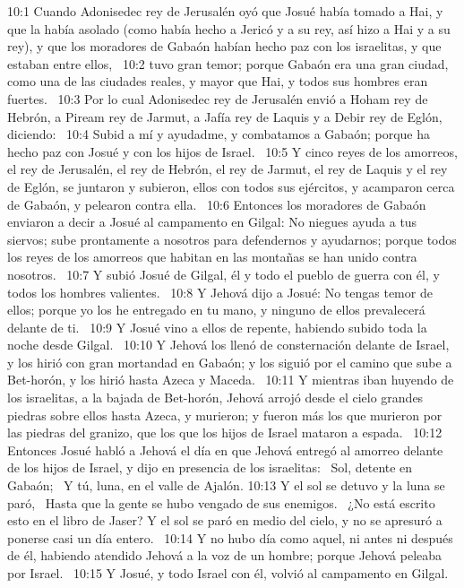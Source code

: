 10:1 Cuando Adonisedec rey de Jerusalén oyó que Josué había tomado a Hai, y que la había asolado (como había hecho a Jericó y a su rey, así hizo a Hai y a su rey), y que los moradores de Gabaón habían hecho paz con los israelitas, y que estaban entre ellos,  
10:2 tuvo gran temor; porque Gabaón era una gran ciudad, como una de las ciudades reales, y mayor que Hai, y todos sus hombres eran fuertes.  
10:3 Por lo cual Adonisedec rey de Jerusalén envió a Hoham rey de Hebrón, a Piream rey de Jarmut, a Jafía rey de Laquis y a Debir rey de Eglón, diciendo:  
10:4 Subid a mí y ayudadme, y combatamos a Gabaón; porque ha hecho paz con Josué y con los hijos de Israel.  
10:5 Y cinco reyes de los amorreos, el rey de Jerusalén, el rey de Hebrón, el rey de Jarmut, el rey de Laquis y el rey de Eglón, se juntaron y subieron, ellos con todos sus ejércitos, y acamparon cerca de Gabaón, y pelearon contra ella.  
10:6 Entonces los moradores de Gabaón enviaron a decir a Josué al campamento en Gilgal: No niegues ayuda a tus siervos; sube prontamente a nosotros para defendernos y ayudarnos; porque todos los reyes de los amorreos que habitan en las montañas se han unido contra nosotros.  
10:7 Y subió Josué de Gilgal, él y todo el pueblo de guerra con él, y todos los hombres valientes.  
10:8 Y Jehová dijo a Josué: No tengas temor de ellos; porque yo los he entregado en tu mano, y ninguno de ellos prevalecerá delante de ti.  
10:9 Y Josué vino a ellos de repente, habiendo subido toda la noche desde Gilgal.  
10:10 Y Jehová los llenó de consternación delante de Israel, y los hirió con gran mortandad en Gabaón; y los siguió por el camino que sube a Bet-horón, y los hirió hasta Azeca y Maceda.  
10:11 Y mientras iban huyendo de los israelitas, a la bajada de Bet-horón, Jehová arrojó desde el cielo grandes piedras sobre ellos hasta Azeca, y murieron; y fueron más los que murieron por las piedras del granizo, que los que los hijos de Israel mataron a espada.  
10:12 Entonces Josué habló a Jehová el día en que Jehová entregó al amorreo delante de los hijos de Israel, y dijo en presencia de los israelitas:  
Sol, detente en Gabaón;  
Y tú, luna, en el valle de Ajalón. 
10:13 Y el sol se detuvo y la luna se paró,  
Hasta que la gente se hubo vengado de sus enemigos.  
¿No está escrito esto en el libro de Jaser? Y el sol se paró en medio del cielo, y no se apresuró a ponerse casi un día entero.  
10:14 Y no hubo día como aquel, ni antes ni después de él, habiendo atendido Jehová a la voz de un hombre; porque Jehová peleaba por Israel.  
10:15 Y Josué, y todo Israel con él, volvió al campamento en Gilgal.  
